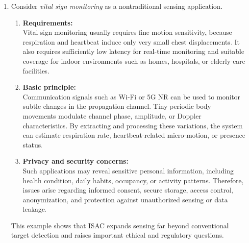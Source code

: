 \begin{enumerate}[label=\textbf{\arabic*.}, leftmargin=*]
\begin{enumerate}[label=(\alph*)]
        \item \textbf{Key obstacles toward commercialization:} \\
        Major obstacles include insufficient standard maturity, unclear return on investment, limited interoperability, high upgrade cost, uncertain regulation regarding sensing data, and the challenge of proving reliable performance in diverse practical scenarios.
    \end{enumerate}

    In short, standardization is progressing, but large-scale deployment still requires technical, economic, and regulatory convergence.

    \item 
    Consider \emph{vital sign monitoring} as a nontraditional sensing application.

    \begin{enumerate}[label=(\alph*)]
        \item \textbf{Requirements:} \\
        Vital sign monitoring usually requires fine motion sensitivity, because respiration and heartbeat induce only very small chest displacements. It also requires sufficiently low latency for real-time monitoring and suitable coverage for indoor environments such as homes, hospitals, or elderly-care facilities.

        \item \textbf{Basic principle:} \\
        Communication signals such as Wi-Fi or 5G NR can be used to monitor subtle changes in the propagation channel. Tiny periodic body movements modulate channel phase, amplitude, or Doppler characteristics. By extracting and processing these variations, the system can estimate respiration rate, heartbeat-related micro-motion, or presence status.

        \item \textbf{Privacy and security concerns:} \\
        Such applications may reveal sensitive personal information, including health condition, daily habits, occupancy, or activity patterns. Therefore, issues arise regarding informed consent, secure storage, access control, anonymization, and protection against unauthorized sensing or data leakage.
    \end{enumerate}

    This example shows that ISAC expands sensing far beyond conventional target detection and raises important ethical and regulatory questions.


\end{enumerate}
